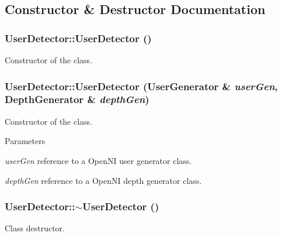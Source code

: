 \subsection{Constructor \& Destructor Documentation}
\hypertarget{classUserDetector_a1c71cbd2b85d7eda4d81021169aaaf57}{
\subsubsection[{UserDetector}]{\setlength{\rightskip}{0pt plus 5cm}UserDetector::UserDetector ()}}
\label{classUserDetector_a1c71cbd2b85d7eda4d81021169aaaf57}
Constructor of the class. \hypertarget{classUserDetector_afa46df6dc0cf46114755f04d3334e117}{
\subsubsection[{UserDetector}]{\setlength{\rightskip}{0pt plus 5cm}UserDetector::UserDetector (UserGenerator \& {\em userGen}, \/  DepthGenerator \& {\em depthGen})}}
\label{classUserDetector_afa46df6dc0cf46114755f04d3334e117}
Constructor of the class. 
\begin{DoxyParams}{Parameters}
\item[{\em userGen}]reference to a OpenNI user generator class. \item[{\em depthGen}]reference to a OpenNI depth generator class. \end{DoxyParams}
\hypertarget{classUserDetector_ae17672b54f2a82d70ea5e22682cd0f0a}{
\subsubsection[{$\sim$UserDetector}]{\setlength{\rightskip}{0pt plus 5cm}UserDetector::$\sim$UserDetector ()}}
\label{classUserDetector_ae17672b54f2a82d70ea5e22682cd0f0a}
Class destructor. 

